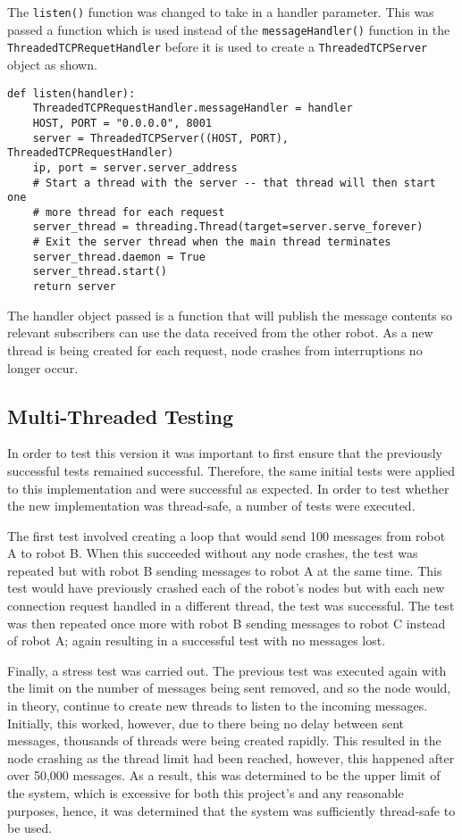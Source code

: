 The \verb|listen()| function was changed to take in a handler parameter. This was
passed a function which is used instead of the \verb|messageHandler()| function in
the \verb|ThreadedTCPRequetHandler| before it is used to create a \verb|ThreadedTCPServer|
object as shown.

\begin{lstlisting}
def listen(handler):
    ThreadedTCPRequestHandler.messageHandler = handler
    HOST, PORT = "0.0.0.0", 8001
    server = ThreadedTCPServer((HOST, PORT), ThreadedTCPRequestHandler)
    ip, port = server.server_address
    # Start a thread with the server -- that thread will then start one
    # more thread for each request
    server_thread = threading.Thread(target=server.serve_forever)
    # Exit the server thread when the main thread terminates
    server_thread.daemon = True
    server_thread.start()
    return server
\end{lstlisting}

The handler object passed is a function that will publish the message contents so
relevant subscribers can use the data received from the other robot. As a new
thread is being created for each request, node crashes from interruptions no longer occur.

\subsection{Multi-Threaded Testing}\label{soft/comms/mttest}
In order to test this version it was important to first ensure that the
previously successful tests remained successful. Therefore,
the same initial tests were applied to this implementation and were 
successful as expected. In order to test whether the new implementation was
thread-safe, a number of tests were executed. 

The first test involved creating a loop that would send 100 messages from robot
A to robot B. When this succeeded without any node crashes, the test was repeated
but with robot B sending messages to robot A at the same time. This test would
have previously crashed each of the robot's nodes but with each new connection
request handled in a different thread, the test was successful. The test was then
repeated once more with robot B sending messages to robot C instead of robot A;
again resulting in a successful test with no messages lost.

Finally, a stress test was carried out. The previous test was executed again with
the limit on the number of messages being sent removed, and so the node would,
in theory, continue to create new threads to listen to the incoming messages.
Initially, this worked, however, due to there being no delay between sent messages,
thousands of threads were being created rapidly. This resulted in the node
crashing as the thread limit had been reached, however, this happened after over
50,000 messages. As a result, this was determined to be the upper limit of the system,
which is excessive for both this project's and any reasonable purposes, hence, it was
determined that the system was sufficiently thread-safe to be used.


